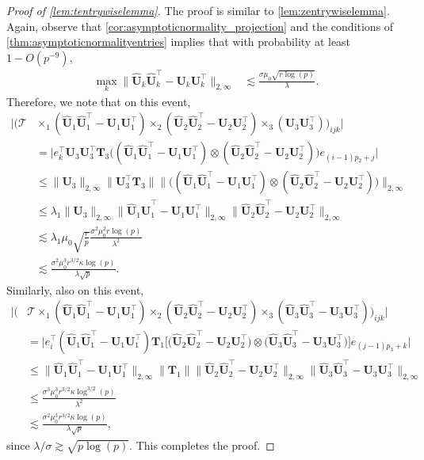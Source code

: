\documentclass[10pt]{article}
\newcommand{\0}{{\mathbf{0}}}
\newcommand{\1}{{\mathbf{1}}}
\newcommand{\U}{{\mathbf{U}}}
\renewcommand{\t}{^{\top}}
\newcommand{\uhat}{\mathbf{\hat{U}}}
\renewcommand{\hat}{\widehat}
\renewcommand{\hat}{\widehat}
\begin{document}
\begin{proof}[Proof of \cref{lem:tentrywiselemma}]
The proof is similar to \cref{lem:zentrywiselemma}.  Again, observe that \cref{cor:asymptoticnormality_projection} and the conditions of \cref{thm:asymptoticnormalityentries} implies that with probability at least $1 - O(p^{-9})$,
\begin{align*}
    \max_k \| \uhat_k \uhat_k\t - \U_k \U_k\t \|_{2,\infty} &\lesssim \frac{\sigma \mu_0 \sqrt{r\log(p)}}{\lambda}.
\end{align*}
Therefore, we note that on this event,
\begin{align*}
    \bigg| \bigg( \mathcal{T}& \times_1 (\uhat_1 \uhat_1\t - \U_1\U_1\t) \times_2 ( \uhat_2 \uhat_2\t - \U_2 \U_2\t) \times_3 (\U_3 \U_3\t) \bigg)_{ijk} \bigg| \\
    &= \bigg| e_k\t \U_3 \U_3\t \mathbf{T}_3 \bigg( (\uhat_1 \uhat_1\t - \U_1\U_1\t) \otimes ( \uhat_2 \uhat_2\t - \U_2 \U_2\t) \bigg) e_{(i-1)p_2 + j} \bigg| \\
    &\leq \| \U_3 \|_{2,\infty} \| \U_3\t \mathbf{T}_3 \| \bigg\| \bigg( (\uhat_1 \uhat_1\t - \U_1\U_1\t) \otimes ( \uhat_2 \uhat_2\t - \U_2 \U_2\t) \bigg) \bigg\|_{2,\infty} \\
    &\leq \lambda_1 \| \U_3 \|_{2,\infty} \| \uhat_1 \uhat_1\t - \U_1\U_1\t \|_{2,\infty} \| \uhat_2 \uhat_2\t - \U_2 \U_2\t \|_{2,\infty} \\
    &\lesssim \lambda_1 \mu_0 \sqrt{\frac{r}{p}} \frac{ \sigma^2 \mu_0^2 r\log(p)}{\lambda^2} \\
    &\lesssim \frac{\sigma^2 \mu_0^3 r^{3/2} \kappa \log(p)}{\lambda\sqrt{p}}.
\end{align*}
Similarly, also on this event,
\begin{align*}
    \bigg|\bigg( &\mathcal{T} \times_1 (\uhat_1 \uhat_1\t - \U_1\U_1\t) \times_2 ( \uhat_2 \uhat_2\t - \U_2 \U_2\t) \times_3 (\uhat_3 \uhat_3\t - \U_3 \U_3\t) \bigg)_{ijk} \bigg| \\
    &= \bigg| e_i\t (\uhat_1 \uhat_1\t - \U_1\U_1\t) \mathbf{T}_1\bigg[ \bigg( \uhat_2 \uhat_2\t - \U_2 \U_2\t \bigg) \otimes \bigg( \uhat_3 \uhat_3\t - \U_3 \U_3\t \bigg) \bigg] e_{(j-1)p_3 + k} \bigg| \\
    &\leq \| \uhat_1 \uhat_1\t - \U_1\U_1\t \|_{2,\infty} \| \mathbf{T}_1 \| \| \uhat_2 \uhat_2\t - \U_2 \U_2\t \|_{2,\infty} \| \uhat_3 \uhat_3\t - \U_3 \U_3\t \|_{2,\infty} \\
    &\leq \frac{\sigma^3 \mu_0^3 r^{3/2} \kappa\log^{3/2}(p)}{\lambda^2} \\
    &\lesssim \frac{\sigma^2 \mu_0^3 r^{3/2} \kappa \log(p)}{\lambda\sqrt{p}},
\end{align*} 
since $\lambda/\sigma \gtrsim \sqrt{p\log(p)}$.  This completes the proof.
\end{proof}
\end{document}
